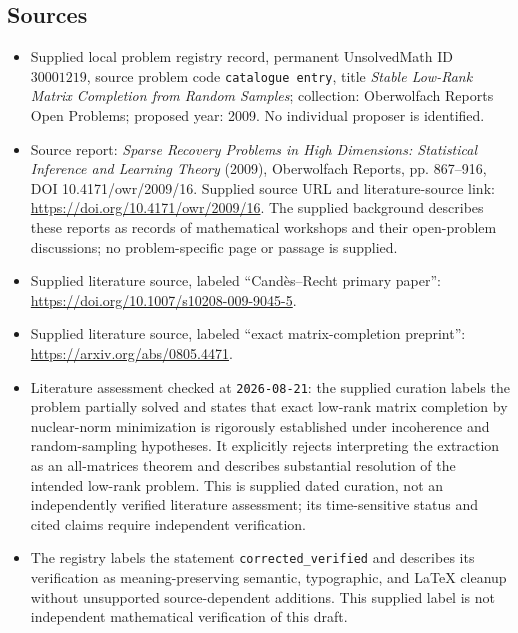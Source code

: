 \documentclass[11pt]{article}
\begin{document}
\subsection{Sources}
\begin{itemize}
\item Supplied local problem registry record, permanent UnsolvedMath ID \(30001219\), source problem code \texttt{catalogue entry}, title \emph{Stable Low-Rank Matrix Completion from Random Samples}; collection: Oberwolfach Reports Open Problems; proposed year: 2009. No individual proposer is identified.
\item Source report: \emph{Sparse Recovery Problems in High Dimensions: Statistical Inference and Learning Theory} (2009), Oberwolfach Reports, pp. 867--916, DOI 10.4171/owr/2009/16. Supplied source URL and literature-source link: \url{https://doi.org/10.4171/owr/2009/16}. The supplied background describes these reports as records of mathematical workshops and their open-problem discussions; no problem-specific page or passage is supplied.
\item Supplied literature source, labeled ``Cand\`es--Recht primary paper'': \url{https://doi.org/10.1007/s10208-009-9045-5}.
\item Supplied literature source, labeled ``exact matrix-completion preprint'': \url{https://arxiv.org/abs/0805.4471}.
\item Literature assessment checked at \texttt{2026-08-21}: the supplied curation labels the problem partially solved and states that exact low-rank matrix completion by nuclear-norm minimization is rigorously established under incoherence and random-sampling hypotheses. It explicitly rejects interpreting the extraction as an all-matrices theorem and describes substantial resolution of the intended low-rank problem. This is supplied dated curation, not an independently verified literature assessment; its time-sensitive status and cited claims require independent verification.
\item The registry labels the statement \texttt{corrected\_verified} and describes its verification as meaning-preserving semantic, typographic, and LaTeX cleanup without unsupported source-dependent additions. This supplied label is not independent mathematical verification of this draft.
\end{itemize}
\end{document}
